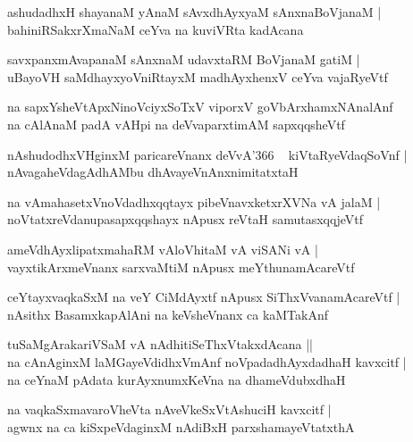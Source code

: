 \documentclass[twoside,12pt,openright]{book}
\newcounter{shloka}[chapter]
\begin{document}
\begin{shloka}
ashudadhxH shayanaM yAnaM sAvxdhAyxyaM sAnxnaBoVjanaM |\\
bahiniRSakxrXmaNaM ceYva na kuviVRta kadAcana 
\end{shloka}

\begin{shloka}
savxpanxmAvapanaM sAnxnaM udavxtaRM BoVjanaM gatiM |\\
uBayoVH saMdhayxyoVniRtayxM  madhAyxhenxV ceYva vajaRyeVtf 
\end{shloka}

\begin{shloka}
na sapxYsheVtApxNinoVciyxSoTxV viporxV goVbArxhamxNAnalAnf \\
na cAlAnaM padA vAHpi na deVvaparxtimAM sapxqqsheVtf
\end{shloka}

\begin{shloka}
nAshudodhxVHginxM paricareVnanx deVvA\char'366 ~ kiVtaRyeVdaqSoVnf |\\
nAvagaheVdagAdhAMbu dhAvayeVnAnxnimitatxtaH
\end{shloka}

\begin{shloka}
na vAmahasetxVnoVdadhxqqtayx pibeVnavxketxrXVNa vA jalaM |\\
noVtatxreVdanupasapxqqshayx nApusx reVtaH samutasxqqjeVtf 
\end{shloka}

\begin{shloka}
ameVdhAyxlipatxmahaRM vAloVhitaM vA viSANi vA |\\
vayxtikArxmeVnanx sarxvaMtiM nApusx meYthunamAcareVtf 
\end{shloka}

\begin{shloka}
ceYtayxvaqkaSxM na veY CiMdAyxtf nApusx SiThxVvanamAcareVtf |\\
nAsithx BasamxkapAlAni na keVsheVnanx ca kaMTakAnf 
\end{shloka}

\begin{shloka}
tuSaMgArakariVSaM vA nAdhitiSeThxVtakxdAcana ||\\
na cAnAginxM laMGayeVdidhxVmAnf noVpadadhAyxdadhaH kavxcitf |\\
na ceYnaM pAdata kurAyxnumxKeVna na dhameVdubxdhaH 
\end{shloka}

\begin{shloka}
na vaqkaSxmavaroVheVta nAveVkeSxVtAshuciH kavxcitf |\\
agwnx na ca kiSxpeVdaginxM nAdiBxH parxshamayeVtatxthA 
\end{shloka}
\end{document}
